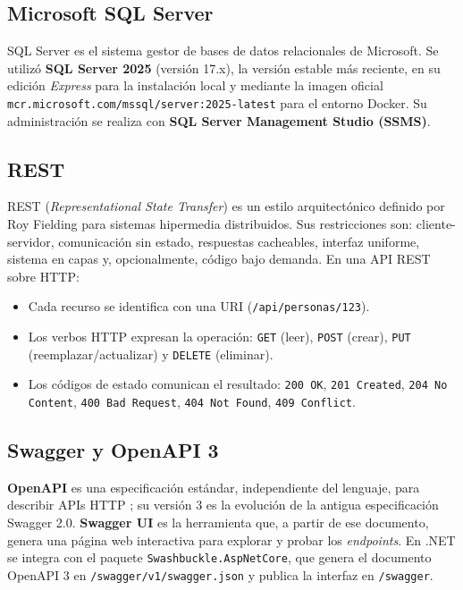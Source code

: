 \documentclass[12pt,letterpaper]{article}
\begin{document}
\subsection{Microsoft SQL Server}
SQL Server es el sistema gestor de bases de datos relacionales de Microsoft. Se utilizó
\textbf{SQL Server 2025} (versión 17.x), la versión estable más reciente, en su edición
\emph{Express} para la instalación local y mediante la imagen oficial
\texttt{mcr.microsoft.com/mssql/server:2025-latest} para el entorno Docker. Su
administración se realiza con \textbf{SQL Server Management Studio (SSMS)}.

\subsection{REST}
REST (\emph{Representational State Transfer}) es un estilo arquitectónico definido por
Roy Fielding \cite{fielding} para sistemas hipermedia distribuidos. Sus restricciones son:
cliente-servidor, comunicación sin estado, respuestas cacheables, interfaz uniforme,
sistema en capas y, opcionalmente, código bajo demanda. En una API REST sobre HTTP:

\begin{itemize}[itemsep=2pt]
  \item Cada recurso se identifica con una URI (\texttt{/api/personas/123}).
  \item Los verbos HTTP expresan la operación: \texttt{GET} (leer), \texttt{POST} (crear),
        \texttt{PUT} (reemplazar/actualizar) y \texttt{DELETE} (eliminar).
  \item Los códigos de estado comunican el resultado: \texttt{200 OK},
        \texttt{201 Created}, \texttt{204 No Content}, \texttt{400 Bad Request},
        \texttt{404 Not Found}, \texttt{409 Conflict}.
\end{itemize}

\subsection{Swagger y OpenAPI 3}
\textbf{OpenAPI} es una especificación estándar, independiente del lenguaje, para
describir APIs HTTP \cite{openapi}; su versión 3 es la evolución de la antigua
especificación Swagger 2.0. \textbf{Swagger UI} es la herramienta que, a partir de ese
documento, genera una página web interactiva para explorar y probar los
\emph{endpoints}. En .NET se integra con el paquete \texttt{Swashbuckle.AspNetCore}, que
genera el documento OpenAPI 3 en \texttt{/swagger/v1/swagger.json} y publica la interfaz
en \texttt{/swagger}.
\end{document}
